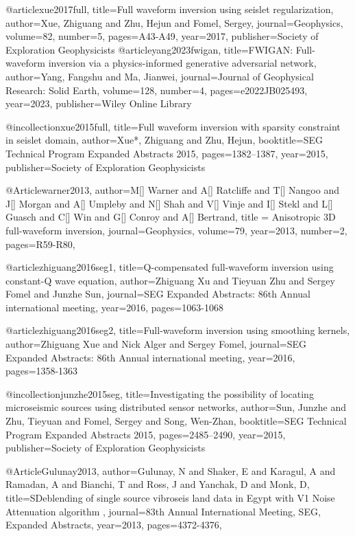 @article{xue2017full,
  title={Full waveform inversion using seislet regularization},
  author={Xue, Zhiguang and Zhu, Hejun and Fomel, Sergey},
  journal={Geophysics},
  volume={82},
  number={5},
  pages={A43-A49},
  year={2017},
  publisher={Society of Exploration Geophysicists}
}
@article{yang2023fwigan,
  title={FWIGAN: Full-waveform inversion via a physics-informed generative adversarial network},
  author={Yang, Fangshu and Ma, Jianwei},
  journal={Journal of Geophysical Research: Solid Earth},
  volume={128},
  number={4},
  pages={e2022JB025493},
  year={2023},
  publisher={Wiley Online Library}
}

@incollection{xue2015full,
  title={Full waveform inversion with sparsity constraint in seislet domain},
  author={Xue*, Zhiguang and Zhu, Hejun},
  booktitle={SEG Technical Program Expanded Abstracts 2015},
  pages={1382--1387},
  year={2015},
  publisher={Society of Exploration Geophysicists}
}


@Article{warner2013,
  author={M[] Warner and A[] Ratcliffe and T[] Nangoo and J[] Morgan and A[] Umpleby and N[] Shah and V[] Vinje and I[] Stekl and L[] Guasch and C[] Win and G[] Conroy and A[] Bertrand},
  title = {Anisotropic 3{D} full-waveform inversion},
  journal={Geophysics},
  volume=79,
  year=2013,
  number=2,
  pages={R59-R80},
}


@article{zhiguang2016seg1,
  title={Q-compensated full-waveform inversion using constant-Q wave equation},
  author={Zhiguang Xu and Tieyuan Zhu and Sergey Fomel and Junzhe Sun},
  journal={SEG Expanded Abstracts: 86th Annual international meeting},
  year={2016},
  pages={1063-1068}
}

@article{zhiguang2016seg2,
  title={Full-waveform inversion using smoothing kernels},
  author={Zhiguang Xue and Nick Alger and Sergey Fomel},
  journal={SEG Expanded Abstracts: 86th Annual international meeting},
  year={2016},
  pages={1358-1363}
}

@incollection{junzhe2015seg,
  title={Investigating the possibility of locating microseismic sources using distributed sensor networks},
  author={Sun, Junzhe and Zhu, Tieyuan and Fomel, Sergey and Song, Wen-Zhan},
  booktitle={SEG Technical Program Expanded Abstracts 2015},
  pages={2485--2490},
  year={2015},
  publisher={Society of Exploration Geophysicists}
}

@Article{Gulunay2013,
  author={Gulunay, N and Shaker, E and Karagul, A and Ramadan, A and Bianchi, T and Ross, J and Yanchak, D and Monk, D},
  title={SDeblending of single source vibroseis land data in Egypt with V1 Noise Attenuation algorithm },
  journal={83th Annual International Meeting, SEG, Expanded Abstracts},
  year=2013,
  pages={4372-4376},
}


